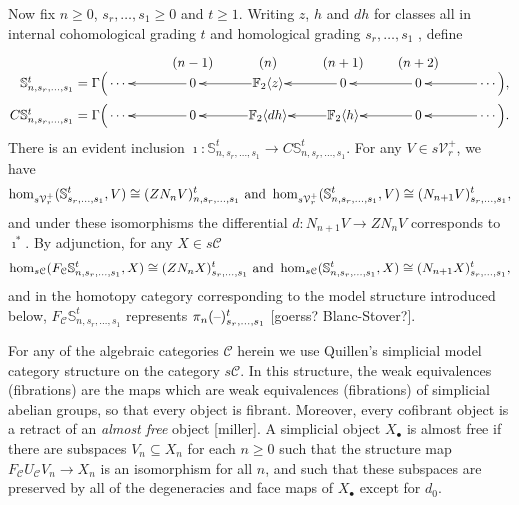 \documentclass[11pt]{amsart}
\theoremstyle{plain}
\theoremstyle{definition}
\newcommand{\DASH}{\textup{--}}
\renewcommand{\to}{\longrightarrow}
\newcommand{\calC}{\mathcal{C}}
\newcommand{\calV}{\mathcal{V}}
\theoremstyle{plain}
\newcommand{\vect}[2]{\calV^{#1}_{#2}}
\newcommand{\F}{\mathbb{F}}
\begin{document}
\begin{Conventions and notation}
Now fix $n\geq0$, $s_r,\ldots,s_1\geq0$ and $t\geq1$. Writing $z$, $h$ and $dh$ for classes all in internal cohomological grading $t$ and homological grading $s_r,\ldots,s_1$ , define
\begin{gather*}
\phantom{C\mathbb{S}_{n,s_r,\ldots,s_1}^t=\Gamma\Bigl(}\xymatrix@R=1.5mm@1@!C{
&{\smash{(n-1)}}&{\smash{(n)}}&{\smash{(n+1)}}&{\smash{(n+2)}}\\
{\makebox[0cm][r]{$\,\mathbb{S}_{n,s_r,\ldots,s_1}^t=\Gamma\Bigl($}\cdots\,} &%
{\,0\,}\ar[l]
&%
\F_2\langle z\rangle\ar[l]
&%
{\,0\,}\ar[l]
&{\,0\,}\ar[l]
&{\,\cdots\Bigr),} \ar[l]
\\
{\makebox[0cm][r]{$\,C\mathbb{S}_{n,s_r,\ldots,s_1}^t=\Gamma\Bigl($}\cdots\,} &%
{\,0\,}\ar[l]
&%
\F_2\langle dh\rangle\ar[l]
&%
\F_2\langle h\rangle\ar[l]
&{\,0\,}\ar[l]
&{\,\cdots\Bigr).} \ar[l]
}
\end{gather*}
There is an evident inclusion $\imath:\mathbb{S}_{n,s_r,\ldots,s_1}^t\to C\mathbb{S}_{n,s_r,\ldots,s_1}^t$. For any $V\in s\vect{+}{r}$, we have
\[\hom_{s\vect{+}{r}}(\mathbb{S}^t_{s_r,\ldots,s_1},V)\cong (ZN_nV)_{n,s_r,\ldots,s_1}^t\textup{ and }\hom_{s\vect{+}{r}}(\mathbb{S}^t_{n,s_r,\ldots,s_1},V)\cong (N_{n+1}V)_{s_r,\ldots,s_1}^t,\]
and under these isomorphisms the differential $d:N_{n+1}V\to ZN_nV$ corresponds to $\imath^*$.
By adjunction, for any $X\in s\calC$
\[\hom_{s\calC}(F_\calC\mathbb{S}^t_{n,s_r,\ldots,s_1},X)\cong (ZN_nX)_{s_r,\ldots,s_1}^t\textup{ and }\hom_{s\calC}(\mathbb{S}^t_{n,s_r,\ldots,s_1},X)\cong (N_{n+1}X)_{s_r,\ldots,s_1}^t,\]
and in the homotopy category corresponding to the model structure introduced below, $F_\calC\mathbb{S}^t_{n,s_r,\ldots,s_1}$ represents $\pi_n(\DASH)^t_{s_r,\ldots,s_1}$ [goerss? Blanc-Stover?].

For any of the algebraic categories $\calC$ herein we use Quillen's simplicial model category structure on the category $s\calC$. In this structure, the weak equivalences (fibrations) are the maps which are weak equivalences (fibrations) of simplicial abelian groups, so that every object is fibrant. Moreover, every cofibrant object is a retract of an \emph{almost free} object [miller]. A simplicial object $X_\bullet$ is almost free if there are subspaces $V_n\subseteq X_n$ for each $n\geq0$ such that the structure map $F_{\calC}U_\calC V_n\to X_n$ is an isomorphism for all $n$, and such that these subspaces are preserved by all of the degeneracies and face maps of $X_\bullet$ except for $d_0$.


\end{Conventions and notation}
\end{document}

